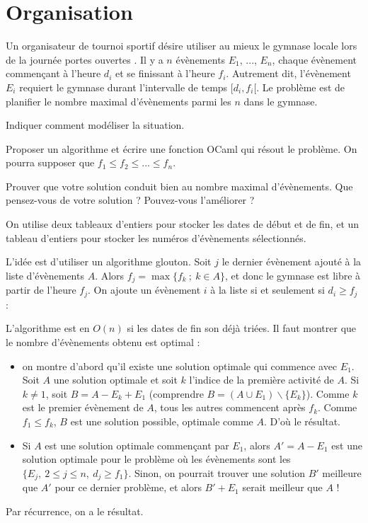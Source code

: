 \renewcommand{\SourceFile}{3-strategies-gloutonnes/src/3-6.ml}

\section{Organisation}

Un organisateur de tournoi sportif désire utiliser au mieux le gymnase locale lors de la journée \og portes ouvertes \fg{}. Il y a $n$ évènements $E_1$, ..., $E_n$, chaque évènement commençant à l'heure $d_i$ et se finissant à l'heure $f_i$. Autrement dit, l'évènement $E_i$ requiert le gymnase durant l'intervalle de temps $[d_i,f_i[$. Le problème est de planifier le nombre maximal d'évènements parmi les $n$ dans le gymnase.

\Q
Indiquer comment modéliser la situation.

\Q
Proposer un algorithme et écrire une fonction OCaml qui résout le problème. On pourra supposer que $f_1 \leq f_2 \leq ... \leq f_n$.

\Q
Prouver que votre solution conduit bien au nombre maximal d'évènements. Que pensez-vous de votre solution ? Pouvez-vous l'améliorer ?

\Corrige

\Q
On utilise deux tableaux d'entiers pour stocker les dates de début et de fin, et un tableau d'entiers pour stocker les numéros d'évènements sélectionnés.

\Q
L'idée est d'utiliser un algorithme glouton. Soit $j$ le dernier évènement ajouté à la liste d'évènements $A$. Alors $f_j=\max\{f_k\ ;\ k\in A\}$, et donc le gymnase est libre à partir de l'heure $f_j$. On ajoute un évènement $i$ à la liste si et seulement si $d_i \geq f_j$ :



\Q
L'algorithme est en $O(n)$ si les dates de fin son déjà triées. Il faut montrer que le nombre d'évènements obtenu est optimal :
\begin{itemize}
    \item on montre d'abord qu'il existe une solution optimale qui commence avec $E_1$. Soit $A$ une solution optimale et soit $k$ l'indice de la première activité de $A$. Si $k \neq 1$, soit $B=A-E_k+E_1$ (comprendre $B=(A\cup E_1)\smallsetminus \{E_k\}$). Comme $k$ est le premier évènement de $A$, tous les autres commencent après $f_k$. Comme $f_1 \leq f_k$, $B$ est une solution possible, optimale comme $A$. D'où le résultat.
    \item Si $A$ est une solution optimale commençant par $E_1$, alors $A'=A-E_1$ est une solution optimale pour le problème où les évènements sont les $\{E_j,\ 2 \leq j \leq n,\ d_j \geq f_1\}$. Sinon, on pourrait trouver une solution $B'$ meilleure que $A'$ pour ce dernier problème, et alors $B'+E_1$ serait meilleur que $A$ !
\end{itemize}
Par récurrence, on a le résultat.
\medskip

